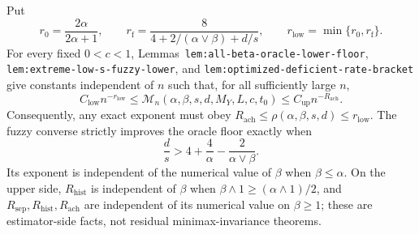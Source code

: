 Put
\[
r_0=\frac{2\alpha}{2\alpha+1},
\qquad
r_{\mathrm f}=\frac{8}{4+2/(\alpha\vee\beta)+d/s},
\qquad
r_{\mathrm{low}}=\min\{r_0,r_{\mathrm f}\}.
\]
For every fixed \(0<c<1\), Lemmas~\texttt{lem:all-beta-oracle-lower-floor}, \texttt{lem:extreme-low-s-fuzzy-lower}, and \texttt{lem:optimized-deficient-rate-bracket} give constants independent of \(n\) such that, for all sufficiently large \(n\),
\[
C_{\mathrm{low}}n^{-r_{\mathrm{low}}}
\le
\mathcal M_n(\alpha,\beta,s,d,M_Y,L,c,t_0)
\le
C_{\mathrm{up}}n^{-R_{\mathrm{ach}}}.
\]
Consequently, any exact exponent must obey \(R_{\mathrm{ach}}\le\rho(\alpha,\beta,s,d)\le r_{\mathrm{low}}\). The fuzzy converse strictly improves the oracle floor exactly when
\[
\frac ds>4+\frac4\alpha-\frac{2}{\alpha\vee\beta}.
\]
Its exponent is independent of the numerical value of \(\beta\) when \(\beta\le\alpha\). On the upper side, \(R_{\mathrm{hist}}\) is independent of \(\beta\) when \(\beta\wedge1\ge(\alpha\wedge1)/2\), and \(R_{\mathrm{sep}},R_{\mathrm{hist}},R_{\mathrm{ach}}\) are independent of its numerical value on \(\beta\ge1\); these are estimator-side facts, not residual minimax-invariance theorems.